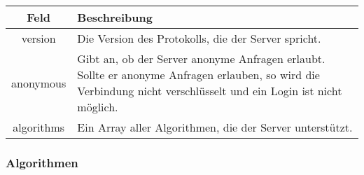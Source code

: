 \documentclass[ngerman,titlepage,parskip=true]{scrartcl}
\begin{document}
    \begin{tabular}{|c|p{14cm}|}
    	\hline
    	\textbf{Feld} & \textbf{Beschreibung} \\ 
    	\hline \hline
    	
    	version & Die Version des Protokolls, die der Server spricht. \\ 
    	\hline
    	
    	anonymous & Gibt an, ob der Server anonyme Anfragen erlaubt. Sollte er anonyme Anfragen erlauben, so wird die Verbindung nicht verschlüsselt und ein Login ist nicht möglich. \\
    	\hline
    	
    	algorithms & Ein Array aller Algorithmen, die der Server unterstützt. \\
    	\hline
    \end{tabular}
    
    \subsubsection*{Algorithmen}
    
\end{document}
